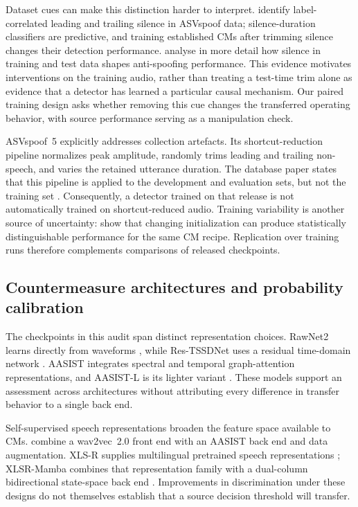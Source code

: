 Dataset cues can make this distinction harder to interpret. \citet{muller21_silence} identify label-correlated
leading and trailing silence in ASVspoof data; silence-duration classifiers are predictive, and training established
CMs after trimming silence changes their detection performance. \citet{zhang23_silence} analyse in more detail how
silence in training and test data shapes anti-spoofing performance. This evidence motivates interventions on the
training audio, rather than treating a test-time trim alone as evidence that a detector has learned a particular
causal mechanism. Our paired training design asks whether removing this cue changes the transferred operating
behavior, with source performance serving as a manipulation check.

ASVspoof~5 explicitly addresses collection artefacts. Its shortcut-reduction pipeline normalizes peak amplitude,
randomly trims leading and trailing non-speech, and varies the retained utterance duration. The database paper
states that this pipeline is applied to the development and evaluation sets, but not the training set
\citep{wang25_asvspoof5_db}. Consequently, a detector trained on that release is not automatically trained on
shortcut-reduced audio. Training variability is another source of uncertainty:
\citet{wang21_comparative} show that changing initialization can produce statistically distinguishable performance
for the same CM recipe. Replication over training runs therefore complements comparisons of released checkpoints.

\subsection{Countermeasure architectures and probability calibration}
The checkpoints in this audit span distinct representation choices. RawNet2 learns directly from waveforms
\citep{tak21_rawnet2}, while Res-TSSDNet uses a residual time-domain network \citep{hua21_res_tssdnet}.
AASIST integrates spectral and temporal graph-attention representations, and AASIST-L is its lighter variant
\citep{jung22_aasist}. These models support an assessment across architectures without attributing every difference
in transfer behavior to a single back end.

Self-supervised speech representations broaden the feature space available to CMs. \citet{tak22_xlsr_aasist}
combine a wav2vec~2.0 front end with an AASIST back end and data augmentation. XLS-R supplies multilingual pretrained
speech representations \citep{babu21_xlsr}; XLSR-Mamba combines that representation family with a dual-column
bidirectional state-space back end \citep{xiao25_xlsrmamba}. Improvements in discrimination under these designs do
not themselves establish that a source decision threshold will transfer.

